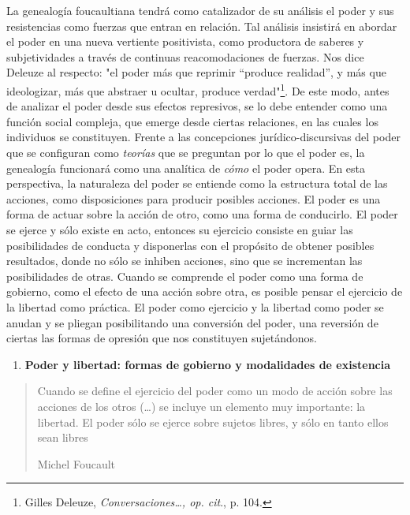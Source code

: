 \documentclass{book}
\begin{document}
La genealogía foucaultiana tendrá como catalizador de su análisis el
poder y sus resistencias como fuerzas que entran en relación. Tal
análisis insistirá en abordar el poder en una nueva vertiente
positivista, como productora de saberes y subjetividades a través de
continuas reacomodaciones de fuerzas. Nos dice Deleuze al respecto: "el
poder más que reprimir ``produce realidad'', y más que ideologizar, más
que abstraer u ocultar, produce verdad"\footnote{Gilles Deleuze,
  \emph{Conversaciones\ldots, op. cit}., p. 104.}. De este modo, antes
de analizar el poder desde sus efectos represivos, se lo debe entender
como una función social compleja, que emerge desde ciertas relaciones,
en las cuales los individuos se constituyen. Frente a las concepciones
jurídico-discursivas del poder que se configuran como \emph{teorías} que
se preguntan por lo que el poder es, la genealogía funcionará como una
analítica de \emph{cómo} el poder opera. En esta perspectiva, la
naturaleza del poder se entiende como la estructura total de las
acciones, como disposiciones para producir posibles acciones. El poder
es una forma de actuar sobre la acción de otro, como una forma de
conducirlo. El poder se ejerce y sólo existe en acto, entonces su
ejercicio consiste en guiar las posibilidades de conducta y disponerlas
con el propósito de obtener posibles resultados, donde no sólo se
inhiben acciones, sino que se incrementan las posibilidades de otras.
Cuando se comprende el poder como una forma de gobierno, como el efecto
de una acción sobre otra, es posible pensar el ejercicio de la libertad
como práctica. El poder como ejercicio y la libertad como poder se
anudan y se pliegan posibilitando una conversión del poder, una
reversión de ciertas las formas de opresión que nos constituyen
sujetándonos.

\begin{enumerate}
\def\labelenumi{\arabic{enumi}.}
\setcounter{enumi}{3}
\item
  \textbf{Poder y libertad: formas de gobierno y modalidades de
  existencia}
\end{enumerate}

\begin{quote}
Cuando se define el ejercicio del poder como un modo de acción sobre las
acciones de los otros (\dots) se incluye un elemento muy
importante: la libertad. El poder sólo se ejerce sobre sujetos libres, y
sólo en tanto ellos sean libres

Michel Foucault
\end{quote}
\end{document}

